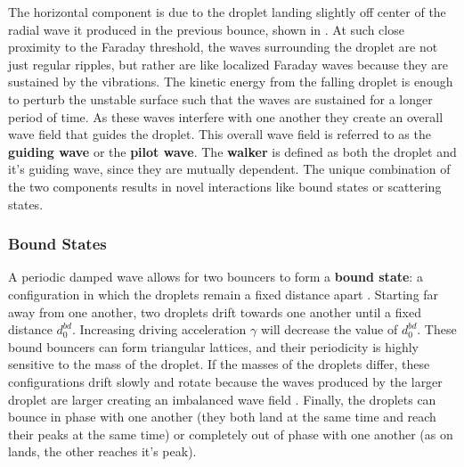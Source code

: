  
The horizontal component is due to the droplet landing slightly off center of the radial wave it produced in the previous bounce, shown in . At such close proximity to the Faraday threshold, the waves surrounding the droplet are not just regular ripples, but rather are like localized Faraday waves because they are sustained by the vibrations. The kinetic energy from the falling droplet is enough to perturb the unstable surface such that the waves are sustained for a longer period of time. As these waves interfere with one another they create an overall wave field that guides the droplet. This overall wave field is referred to as the \textbf{guiding wave} or the \textbf{pilot wave}. The \textbf{walker} is defined as both the droplet and it's guiding wave, since they are mutually dependent. The unique combination of the two components results in novel interactions like bound states or scattering states.



\subsubsection{Bound States}
            A periodic damped wave allows for two bouncers to form a \textbf{bound state}: a configuration in which the droplets remain a fixed distance apart \cite{Protiere2005}.  Starting far away from one another, two droplets drift towards one another until a fixed distance $d_{0}^{bd}$. Increasing driving acceleration $\gamma$ will decrease the value of $d_{0}^{bd}$. These bound bouncers can form triangular lattices, and their periodicity is highly sensitive to the mass of the droplet. If the masses of the droplets differ, these configurations drift slowly and rotate because the waves produced by the larger droplet are larger creating an imbalanced wave field . Finally, the droplets can bounce in phase with one another (they both land at the same time and reach their peaks at the same time) or completely out of phase with one another (as on lands, the other reaches it's peak).
            
